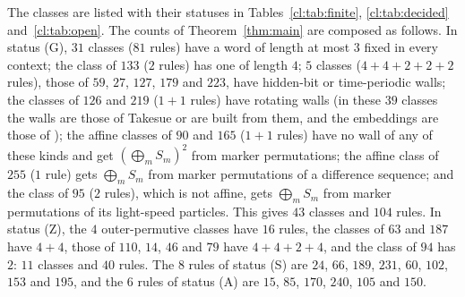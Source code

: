 The classes are listed with their statuses in Tables~\ref{cl:tab:finite}, \ref{cl:tab:decided} and~\ref{cl:tab:open}. The counts of Theorem~\ref{thm:main} are composed as follows. In status (G), $31$ classes ($81$ rules) have a word of length at most $3$ fixed in every context; the class of $133$ ($2$ rules) has one of length $4$; $5$ classes ($4+4+2+2+2$ rules), those of $59$, $27$, $127$, $179$ and $223$, have hidden-bit or time-periodic walls; the classes of $126$ and $219$ ($1+1$ rules) have rotating walls (in these $39$ classes the walls are those of Takesue \cite[Section~4]{Takesue1989} or are built from them, and the embeddings are those of \cite{PaperC}); the affine classes of $90$ and $165$ ($1+1$ rules) have no wall of any of these kinds and get $(\bigoplus_mS_m)^2$ from marker permutations; the affine class of $255$ ($1$ rule) gets $\bigoplus_mS_m$ from marker permutations of a difference sequence; and the class of $95$ ($2$ rules), which is not affine, gets $\bigoplus_mS_m$ from marker permutations of its light-speed particles. This gives $43$ classes and $104$ rules. In status (Z), the $4$ outer-permutive classes have $16$ rules, the classes of $63$ and $187$ have $4+4$, those of $110$, $14$, $46$ and $79$ have $4+4+2+4$, and the class of $94$ has $2$: $11$ classes and $40$ rules. The $8$ rules of status (S) are $24$, $66$, $189$, $231$, $60$, $102$, $153$ and $195$, and the $6$ rules of status (A) are $15$, $85$, $170$, $240$, $105$ and $150$.


